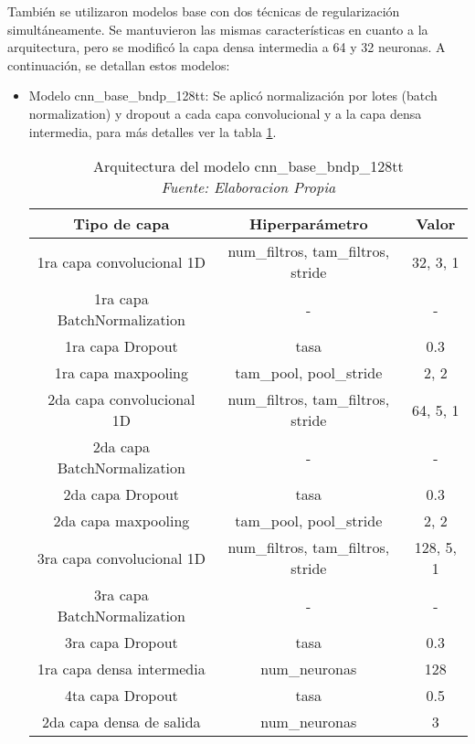 \begin{itemize}
\end{itemize}

También se utilizaron modelos base con dos técnicas de regularización simultáneamente. Se mantuvieron las mismas características en cuanto a la arquitectura, pero se modificó la capa densa intermedia a 64 y 32 neuronas. A continuación, se detallan estos modelos:

\begin{itemize}

\item Modelo cnn\_base\_bndp\_128tt: Se aplicó normalización por lotes (batch normalization) y dropout a cada capa convolucional y a la capa densa intermedia, para más detalles ver la tabla \ref{tbl:cnn_base_bndp_128tt}.

\begin{table}[!ht]
	\centering
	\begin{tabular}{|c|c|c|}
		\hline
		\textbf{Tipo de capa} & \textbf{Hiperparámetro} & \textbf{Valor} \\ \hline
		1ra capa convolucional 1D & num\_filtros, tam\_filtros, stride & 32, 3, 1 \\ \hline
		1ra capa BatchNormalization & - & - \\ \hline
		1ra capa Dropout & tasa & 0.3 \\ \hline
		1ra capa maxpooling & tam\_pool, pool\_stride & 2, 2 \\ \hline
		2da capa convolucional 1D & num\_filtros, tam\_filtros, stride & 64, 5, 1 \\ \hline
		2da capa BatchNormalization & - & - \\ \hline
		2da capa Dropout & tasa & 0.3 \\ \hline
		2da capa maxpooling & tam\_pool, pool\_stride & 2, 2 \\ \hline
		3ra capa convolucional 1D & num\_filtros, tam\_filtros, stride & 128, 5, 1 \\ \hline
		3ra capa BatchNormalization & - & - \\ \hline
		3ra capa Dropout & tasa & 0.3 \\ \hline
		1ra capa densa intermedia & num\_neuronas & 128 \\ \hline
		4ta capa Dropout & tasa & 0.5 \\ \hline
		2da capa densa de salida & num\_neuronas & 3 \\ \hline
	\end{tabular}
	\caption{Arquitectura del modelo cnn\_base\_bndp\_128tt
	\\\textit{Fuente: Elaboracion Propia}}
	\label{tbl:cnn_base_bndp_128tt}
\end{table}



\end{itemize}
